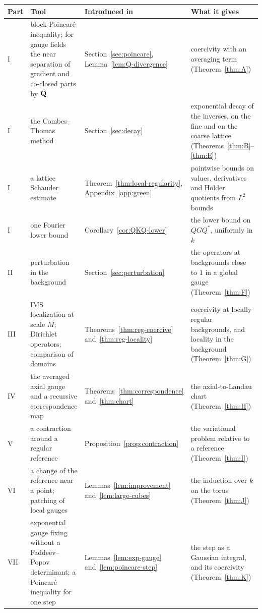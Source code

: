 \begin{table}[tbp]
\centering\footnotesize
\renewcommand{\arraystretch}{1.12}
\begin{tabular}{|p{}|p{}|p{}|p{}|}
\hline
Part & Tool & Introduced in & What it gives\tabularnewline
\hline
I & \raggedright block Poincar\'e inequality; for gauge fields the near separation of gradient and co-closed parts by $\mathbf Q$ & \raggedright Section~\ref{sec:poincare}, Lemma~\ref{lem:Q-divergence} & \raggedright coercivity with an averaging term (Theorem~\ref{thm:A})\tabularnewline
I & \raggedright the Combes--Thomas method & \raggedright Section~\ref{sec:decay} & \raggedright exponential decay of the inverses, on the fine and on the coarse lattice (Theorems~\ref{thm:B}--\ref{thm:E})\tabularnewline
I & \raggedright a lattice Schauder estimate & \raggedright Theorem~\ref{thm:local-regularity}, Appendix~\ref{app:green} & \raggedright pointwise bounds on values, derivatives and H\"older quotients from $L^2$ bounds\tabularnewline
I & \raggedright one Fourier lower bound & \raggedright Corollary~\ref{cor:QKQ-lower} & \raggedright the lower bound on $QGQ^*$, uniformly in $k$\tabularnewline
II & \raggedright perturbation in the background & \raggedright Section~\ref{sec:perturbation} & \raggedright the operators at backgrounds close to $1$ in a global gauge (Theorem~\ref{thm:F})\tabularnewline
III & \raggedright IMS localization at scale $M$; Dirichlet operators; comparison of domains & \raggedright Theorems~\ref{thm:reg-coercive} and~\ref{thm:reg-locality} & \raggedright coercivity at locally regular backgrounds, and locality in the background (Theorem~\ref{thm:G})\tabularnewline
IV & \raggedright the averaged axial gauge and a recursive correspondence map & \raggedright Theorems~\ref{thm:correspondence} and~\ref{thm:chart} & \raggedright the axial-to-Landau chart (Theorem~\ref{thm:H})\tabularnewline
V & \raggedright a contraction around a regular reference & \raggedright Proposition~\ref{prop:contraction} & \raggedright the variational problem relative to a reference (Theorem~\ref{thm:I})\tabularnewline
VI & \raggedright a change of the reference near a point; patching of local gauges & \raggedright Lemmas~\ref{lem:improvement} and~\ref{lem:large-cubes} & \raggedright the induction over $k$ on the torus (Theorem~\ref{thm:J})\tabularnewline
VII & \raggedright exponential gauge fixing without a Faddeev--Popov determinant; a Poincar\'e inequality for one step & \raggedright Lemmas~\ref{lem:exp-gauge} and~\ref{lem:poincare-step} & \raggedright the step as a Gaussian integral, and its coercivity (Theorem~\ref{thm:K})\tabularnewline

\end{tabular}
\end{table}
